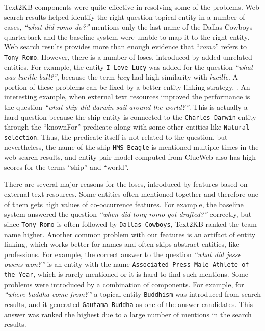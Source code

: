 Text2KB components were quite effective in resolving some of the problems.
Web search results helped identify the right question topical entity in a number of cases, \eg \textit{``what did romo do?''} mentions only the last name of the Dallas Cowboys quarterback and the baseline system were unable to map it to the right entity.
Web search results provides more than enough evidence that ``\textit{romo}'' refers to \texttt{Tony Romo}.
However, there is a number of loses, introduced by added unrelated entities.
For example, the entity \texttt{I Love Lucy} was added for the question \textit{``what was lucille ball?''}, because the term \textit{lucy} had high similarity with \textit{lucille}.
A portion of these problems can be fixed by a better entity linking strategy, \eg \cite{SMAPH_ERD:2014}.
An interesting example, when external text resources improved the performance is the question \textit{``what ship did darwin sail around the world?''}.
This is actually a hard question because the ship entity is connected to the \texttt{Charles Darwin} entity through the ``knownFor'' predicate along with some other entities like \texttt{Natural selection}.
Thus, the predicate itself is not related to the question, but nevertheless, the name of the ship \texttt{HMS Beagle} is mentioned multiple times in the web search results, and entity pair model computed from ClueWeb also has high scores for the terms ``ship'' and ``world''.

There are several major reasons for the loses, introduced by features based on external text resources.
Some entities often mentioned together and therefore one of them gets high values of co-occurrence features.
For example, the baseline system answered the question \textit{``when did tony romo got drafted?''} correctly, but since \texttt{Tony Romo} is often followed by \texttt{Dallas Cowboys}, Text2KB ranked the team name higher.
Another common problem with our features is an artifact of entity linking, which works better for names and often skips abstract entities, like professions.
For example, the correct answer to the question \textit{``what did jesse owens won?''} is an entity with the name \texttt{Associated Press Male Athlete of the Year}, which is rarely mentioned or it is hard to find such mentions.
Some problems were introduced by a combination of components.
For example, for \textit{``where buddha come from?''} a topical entity \texttt{Buddhism} was introduced from search results, and it generated \texttt{Gautama Buddha} as one of the answer candidates.
This answer was ranked the highest due to a large number of mentions in the search results.

